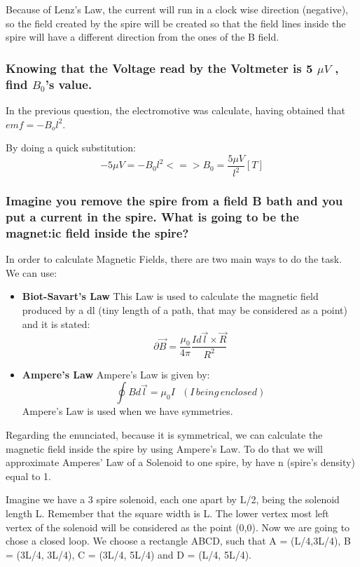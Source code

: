 \documentclass[a4paper,12pt]{article}
\begin{document}
Because of Lenz's Law, the current will run in a clock wise direction (negative), so the field created by the spire will be created so that the field lines inside the spire will have a different direction from the ones of the B field.

\subsubsection{Knowing that the Voltage read by the Voltmeter is 5 $\mu V$  , find $B_{0}$'s value. }
\hspace{1cm} In the previous question, the electromotive was calculate, having obtained that $emf = -B_ol^2$.

By doing a quick substitution:
\begin{equation}
-5 \mu V = -B_0l^2 <=> B_0 = \frac{5 \mu V}{l^2} [T]
\end{equation}

\subsubsection{Imagine you remove the spire from a field B bath and you put a current in the spire. What is going to be the magnet:ic field inside the spire? }
In order to calculate Magnetic Fields, there are two main ways to do the task. We can use:
\begin{itemize}
\item \textbf{Biot-Savart's Law}
This Law is used to calculate the magnetic field produced by a dl (tiny length of a path, that may be considered as a point) and it is stated:
\begin{equation}
\partial \vec{B} = \frac{\mu _0}{4 \pi} \frac{I d\vec{l}\times \vec{R}}{R^2}
\end{equation}
\item \textbf{Ampere's Law}
Ampere's Law is given by:
\begin{equation}
\oint Bd\vec{l} = \mu _0 I \, \, \, \, \left ( I \,being \,enclosed \right )
\end{equation}
Ampere's Law is used when we have symmetries. 
\end{itemize}


Regarding the enunciated, because it is symmetrical, we can calculate the magnetic field inside the spire by using Ampere's Law. To do that we will approximate Amperes' Law of a Solenoid to one spire, by have n (spire's density) equal to 1.

Imagine we have a 3 spire solenoid, each one apart by L/2, being the solenoid length L. Remember that the square width is L. The lower vertex most left vertex of the solenoid will be considered as the point (0,0). Now we are going to chose a closed loop. We choose a rectangle ABCD, such that A = (L/4,3L/4), B = (3L/4, 3L/4), C = (3L/4, 5L/4) and D = (L/4, 5L/4). 
\end{document}
